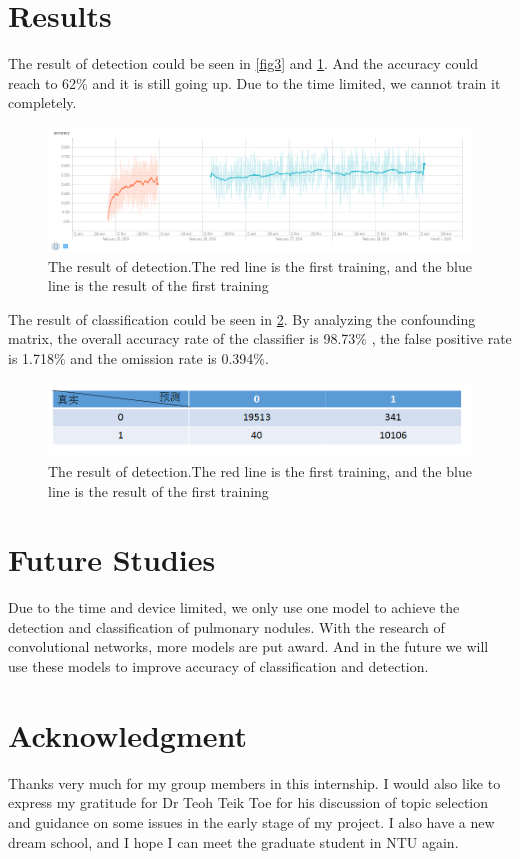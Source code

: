 \documentclass[conference]{IEEEtran}
\begin{document}
\begin{CJK}{UTF8}{gbsn}
\section{Results}
The result of detection could be seen in \ref{fig3} and \ref{fig5}. And the accuracy could reach to 62$\%$ and it is still going up. Due to the 
time limited, we cannot train it completely.\\
\begin{figure}[htbp]
    \centerline{\includegraphics[scale=0.2]{segaccuracy.PNG}}
    \caption{The result of detection.The red line is the first training, and the blue line is the result of the first training}
    \label{fig5}
    \end{figure}
The result of classification could be seen in \ref{fig6}. By analyzing the confounding matrix, the overall accuracy rate of the classifier is 98.73$\%$
, the false positive rate is 1.718$\%$ and the omission rate is 0.394$\%$.
\begin{figure}[htbp]
    \centerline{\includegraphics[scale=0.3]{ConfusionMatrix.PNG}}
    \caption{The result of detection.The red line is the first training, and the blue line is the result of the first training}
    \label{fig6}
    \end{figure}
\section{Future Studies}
Due to the time and device limited, we only use one model to achieve the detection and classification of pulmonary nodules. With the research of convolutional networks,
more models are put award. And in the future we will use these models to improve accuracy of classification and detection.


\section*{Acknowledgment}
Thanks very much for my group members in this internship. I would also like to express my gratitude for Dr Teoh Teik Toe for his discussion of topic selection and guidance on some issues in the early stage of my project. I also have a new dream school, and I hope I can meet the graduate student in NTU again.


\end{CJK}
\end{document}
